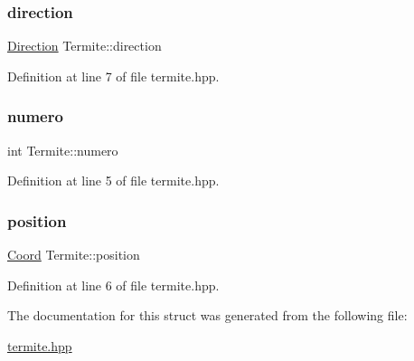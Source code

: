\mbox{\label{structTermite_ac9efb06efee1f16991a1d7fea6d38b83}} 
\subsubsection{\texorpdfstring{direction}{direction}}
{\footnotesize\ttfamily \hyperlink{coord_8hpp_a224b9163917ac32fc95a60d8c1eec3aa}{Direction} Termite\+::direction}



Definition at line 7 of file termite.\+hpp.

\mbox{\label{structTermite_a46adc25bf86ecdb46da04691190e680e}} 
\subsubsection{\texorpdfstring{numero}{numero}}
{\footnotesize\ttfamily int Termite\+::numero}



Definition at line 5 of file termite.\+hpp.

\mbox{\label{structTermite_ab15e5a7c1ffc20223c2bf9d158509a06}} 
\subsubsection{\texorpdfstring{position}{position}}
{\footnotesize\ttfamily \hyperlink{structCoord}{Coord} Termite\+::position}



Definition at line 6 of file termite.\+hpp.



The documentation for this struct was generated from the following file\+:\begin{DoxyCompactItemize}
\item 
\hyperlink{termite_8hpp}{termite.\+hpp}\end{DoxyCompactItemize}
